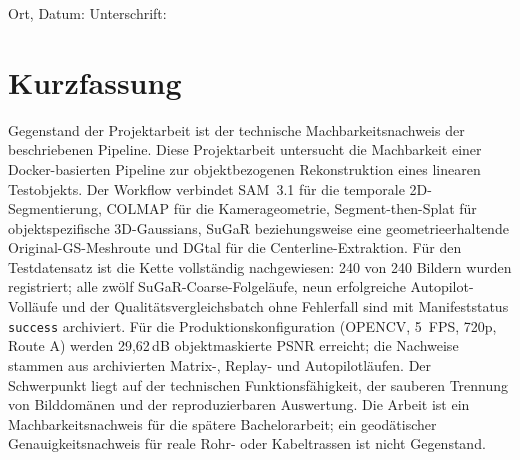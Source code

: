 \documentclass[12pt,a4paper]{article}
\newif\ifincludeappendices
\begin{document}
\vfill
\noindent Ort, Datum: \dotfill\hfill Unterschrift: \dotfill
\fi
\section*{Kurzfassung}
Gegenstand der Projektarbeit ist der technische Machbarkeitsnachweis der beschriebenen Pipeline.
Diese Projektarbeit untersucht die Machbarkeit einer Docker-basierten Pipeline zur
objektbezogenen Rekonstruktion eines linearen Testobjekts. Der Workflow verbindet
SAM~3.1 für die temporale 2D-Segmentierung, COLMAP für die Kamerageometrie,
Segment-then-Splat für objektspezifische 3D-Gaussians, SuGaR beziehungsweise eine
geometrieerhaltende Original-GS-Meshroute und DGtal für die Centerline-Extraktion.
Für den Testdatensatz ist die Kette vollständig nachgewiesen: 240 von 240 Bildern
wurden registriert; alle zwölf SuGaR-Coarse-Folgeläufe, neun erfolgreiche Autopilot-Volläufe
und der Qualitätsvergleichsbatch ohne Fehlerfall sind mit Manifeststatus
\texttt{success} archiviert. Für die
Produktionskonfiguration (OPENCV, 5~FPS, 720p, Route A) werden 29,62\,dB
objektmaskierte PSNR erreicht; die Nachweise stammen aus archivierten Matrix-,
Replay- und Autopilotläufen. Der Schwerpunkt liegt auf der technischen
Funktionsfähigkeit, der sauberen Trennung von Bilddomänen und der reproduzierbaren
Auswertung. Die Arbeit ist ein Machbarkeitsnachweis für die spätere
Bachelorarbeit; ein geodätischer Genauigkeitsnachweis für reale Rohr- oder
Kabeltrassen ist nicht Gegenstand.
\clearpage

\tableofcontents
\listoffigures
\listoftables
\clearpage
{}











\printbibliography[heading=bibintoc,title={Literatur und Referenzen}]

\ifincludeappendices
\appendix







\fi
\end{document}

